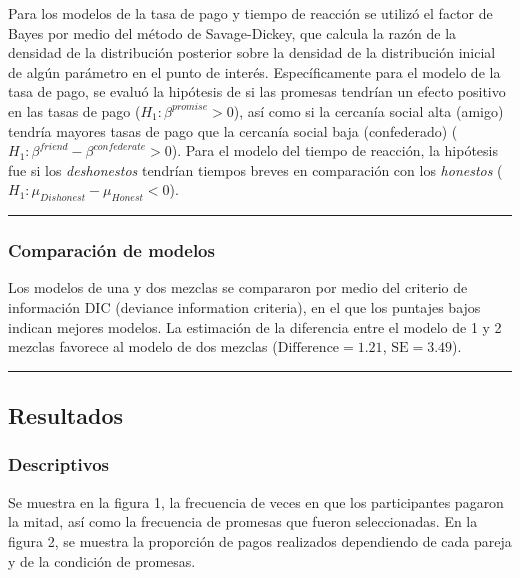 \documentclass[]{article}
\begin{document}
Para los modelos de la tasa de pago y tiempo de reacción se utilizó el
factor de Bayes por medio del método de Savage-Dickey, que calcula la
razón de la densidad de la distribución posterior sobre la densidad de
la distribución inicial de algún parámetro en el punto de interés.
Específicamente para el modelo de la tasa de pago, se evaluó la
hipótesis de si las promesas tendrían un efecto positivo en las tasas de
pago (\(H_1: \beta^{promise} > 0\)), así como si la cercanía social alta
(amigo) tendría mayores tasas de pago que la cercanía social baja
(confederado) (\(H_1: \beta^{friend} - \beta^{confederate} > 0\)). Para
el modelo del tiempo de reacción, la hipótesis fue si los
\emph{deshonestos} tendrían tiempos breves en comparación con los
\emph{honestos} (\(H_1: \mu_{Dishonest} - \mu_{Honest} < 0\)).

\begin{center}\rule{0.5\linewidth}{\linethickness}\end{center}

\subsubsection{Comparación de modelos}\label{comparacion-de-modelos}

Los modelos de una y dos mezclas se compararon por medio del criterio de
información DIC (deviance information criteria), en el que los puntajes
bajos indican mejores modelos. La estimación de la diferencia entre el
modelo de 1 y 2 mezclas favorece al modelo de dos mezclas
(\(\mathrm{Difference}= 1.21\), \(\mathrm{SE}= 3.49\)).

\begin{center}\rule{0.5\linewidth}{\linethickness}\end{center}

\subsection{Resultados}\label{resultados}

\subsubsection{Descriptivos}\label{descriptivos}

Se muestra en la figura 1, la frecuencia de veces en que los
participantes pagaron la mitad, así como la frecuencia de promesas que
fueron seleccionadas. En la figura 2, se muestra la proporción de pagos
realizados dependiendo de cada pareja y de la condición de promesas.
\end{document}

